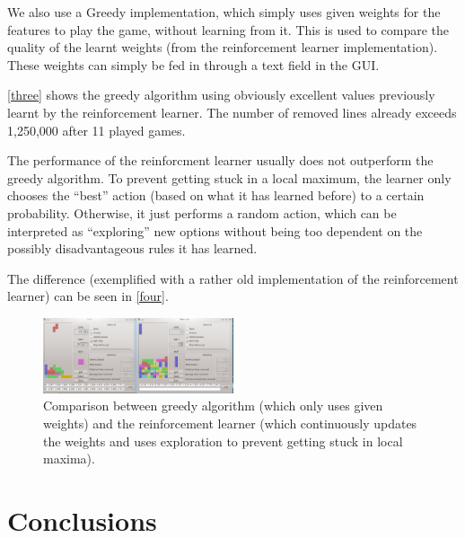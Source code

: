 \documentclass{ml}
\begin{document}
We also use a Greedy implementation, which simply uses given weights for the features to play the game, without learning from it. 
This is used to compare the quality of the learnt weights (from the reinforcement learner implementation). 
These weights can simply be fed in through a text field in the GUI. 

\autoref{three} shows the greedy algorithm using obviously excellent values previously learnt by the reinforcement learner.
The number of removed lines already exceeds 1,250,000 after 11 played games. 

The performance of the reinforcment learner usually does not outperform the greedy algorithm. 
To prevent getting stuck in a local maximum, the learner only chooses the ``best'' action (based on what it has learned before) to a certain probability. 
Otherwise, it just performs a random action, which can be interpreted as ``exploring'' new options without being too dependent on the possibly disadvantageous rules it has learned. 

The difference (exemplified with a rather old implementation of the reinforcement learner) can be seen in \autoref{four}.


\begin{figure}
\vspace{-10pt}
  \begin{center}
    \includegraphics[width=0.5\textwidth]{img/four.png}
  \end{center}
  \vspace{-10pt}
  \caption{\small{Comparison between greedy algorithm (which only uses given weights) and the reinforcement learner (which continuously updates the weights and uses exploration to prevent getting stuck in local maxima).}}
  \label{four}
  \vspace{-10pt}
\end{figure}




\section{Conclusions}
\label{conclusions}



\newpage


\end{document}
